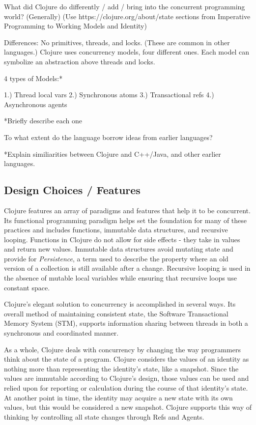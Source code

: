     What did Clojure do differently / add / bring into the concurrent programming world? (Generally)
        (Use https://clojure.org/about/state sections from Imperative Programming to Working Models and Identity)
        \cite{website:clojure-lang-reference}
    
    Differences: No primitives, threads, and locks. (These are common in other languages.) Clojure uses concurrency models, four different ones. Each model can symbolize an abstraction above threads and locks.
    
    4 types of Models:*
    
    1.) Thread local vars
    2.) Synchronous atoms
    3.) Transactional refs
    4.) Asynchronous agents
    
    *Briefly describe each one
    
    To what extent do the language borrow ideas from earlier languages?
    
    *Explain similiarities between Clojure and C++/Java, and other earlier languages.
    
    \cite{galpin_2010}
    
	
\subsection{Design Choices / Features}
    
   Clojure features an array of paradigms and features that help it to be concurrent. Its functional programming paradigm helps set the foundation for many of these practices and includes functions, immutable data structures, and recursive looping. Functions in Clojure do not allow for side effects - they take in values and return new values. Immutable data structures avoid mutating state and provide for \textit{Persistence}, a term used to describe the property where an old version of a collection is still available after a change. Recursive looping is used in the absence of mutable local variables while ensuring that recursive loops use constant space.
    
    Clojure's elegant solution to concurrency is accomplished in several ways. Its overall method of maintaining consistent state, the Software Transactional Memory System (STM), supports information sharing between threads in both  a synchronous and coordinated manner.
    
    As a whole, Clojure deals with concurrency by changing the way programmers think about the state of a program. Clojure considers the values of an identity as nothing more than representing the identity's state, like a snapshot. Since the values are immutable according to Clojure's design, those values can be used and relied upon for reporting or calculation during the course of that identity's state. At another point in time, the identity may acquire a new state with its own values, but this would be considered a new snapshot. Clojure supports this way of thinking by controlling all state changes through Refs and Agents.

